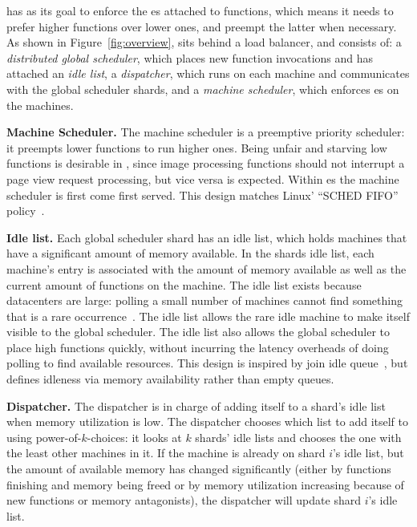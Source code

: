 \Sys{} has as its goal to enforce the \class{}es attached to
functions, which means it needs to prefer higher \class{} functions
over lower ones, and preempt the latter when necessary. As shown in
Figure~\ref{fig:overview}, \sys{} sits behind a load balancer, and
consists of: a \textit{distributed global scheduler}, which places new
function invocations and has attached an \textit{idle list}, a
\textit{dispatcher}, which runs on each machine and communicates with
the global scheduler shards, and a \textit{machine scheduler}, which
enforces \class{}es on the machines.


\textbf{Machine Scheduler.}
The machine scheduler is a preemptive priority scheduler: it preempts lower
\class{} functions to run higher \class{} ones. Being unfair and starving low
\class{} functions is desirable in \sys{}, since image processing functions
should not interrupt a page view request processing, but vice versa is expected.
Within \class{}es the machine scheduler is first come first served. This design
matches Linux' ``SCHED FIFO'' policy~\cite{linux-sched}.


\textbf{Idle list.}  Each global scheduler shard has an idle list,
which holds machines that have a significant amount of memory
available. In the shards idle list, each machine's entry is associated
with the amount of memory available as well as the current amount of
functions on the machine. The idle list exists because datacenters are
large: polling a small number of machines cannot find something that
is a rare occurrence~\cite{join-idle-queue}. The idle list allows the
rare idle machine to make itself visible to the global scheduler. The
idle list also allows the global scheduler to place high \class{}
functions quickly, without incurring the latency overheads of doing
polling to find available resources. This design is inspired by join
idle queue~\cite{join-idle-queue}, but defines idleness via memory
availability rather than empty queues.


\textbf{Dispatcher.}
The dispatcher is in charge of adding itself to a shard's idle list when memory
utilization is low. The dispatcher chooses which list to add itself to using
power-of-$k$-choices: it looks at $k$ shards' idle lists and chooses the one with
the least other machines in it. If the machine is already on shard $i$'s idle
list, but the amount of available memory has changed significantly (either by
functions finishing and memory being freed or by memory utilization increasing
because of new functions or memory antagonists), the dispatcher will update
shard $i$'s idle list.

